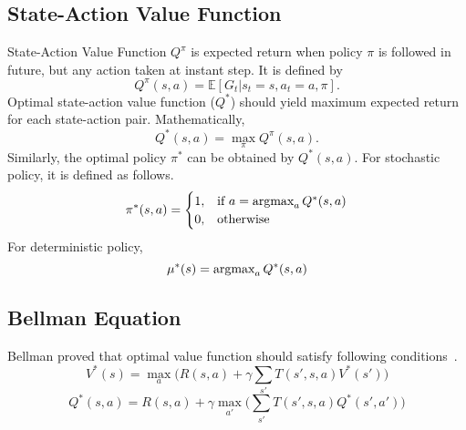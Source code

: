 \subsection{State-Action Value Function}

State-Action Value Function $Q^{\pi}$ is expected return when policy $\pi$ is followed in future, 
but any action taken at instant step. It is defined by
\begin{equation}
Q^{\pi}(s,a) = \mathbb{E}[G_t|s_t=s, a_t=a, \pi]. %
\end{equation}
Optimal state-action value function ($Q^{*}$) should yield maximum expected return for each state-action pair. 
Mathematically,  
\begin{equation}
Q^{*}(s,a) = \max_{\pi} Q^{\pi}(s,a).
\end{equation}
Similarly, the optimal policy $\pi^*$ can be obtained by $Q^{*}(s,a)$. For stochastic policy, it is defined as follows.
\begin{equation}
\label{eqn:policy_stochastic_q}
\pi^{*}(s,a) = 
\begin{cases}
1,   & \text{if  } a = \operatorname{\textup{argmax}}_{a} Q^{*}(s,a) \\
0,   & \text{otherwise  }
\end{cases} 
\end{equation}
For deterministic policy, 
\begin{equation}
\label{eqn:policy_deterministic_q}
\mu^{*}(s) = \operatorname{\textup{argmax}}_{a} Q^{*}(s,a)
\end{equation}

\subsection{Bellman Equation}

Bellman proved that optimal value function should satisfy following conditions~\cite{bellman_dynamic_2003}. 
\begin{equation}
\label{eqn:bellman_v}
V^{*}(s) = \max_{a} \big( R(s,a) + \gamma \sum_{s'} T(s',s,a) V^{*}(s') \big)
\end{equation}
\begin{equation}
\label{eqn:bellman_q}
Q^{*}(s,a) = R(s,a) + \gamma \max_{a'} \big( \sum_{s'} T(s',s,a) Q^{*}(s',a') \big)
\end{equation}
